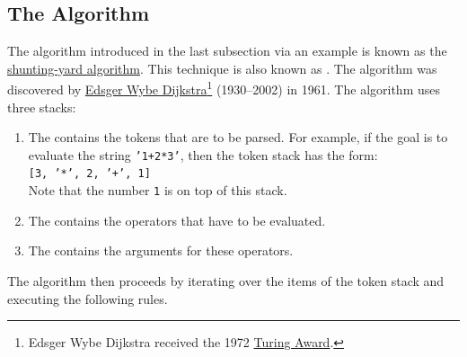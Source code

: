 \subsection{The Algorithm \label{algo-arith}}
The algorithm introduced in the last subsection via an example is known as the 
\href{http://en.wikipedia.org/wiki/Shunting-yard_algorithm}{shunting-yard algorithm}.  
This technique is also known as .
The algorithm was discovered by  \href{http://en.wikipedia.org/wiki/Edsger_Dijkstra}{Edsger Wybe Dijkstra}\footnote{
  Edsger Wybe Dijkstra received the 1972 \href{https://en.wikipedia.org/wiki/Turing_Award}{Turing Award}.
}
(1930--2002) in 1961.   The algorithm uses three stacks:
\begin{enumerate}
\item The  contains the tokens that are to be parsed.  For example,
      if the goal is to evaluate the string \texttt{'1+2*3'}, then the token stack has the form:
      \\[0.2cm]
      \hspace*{1.3cm}
      \texttt{[3, '*', 2, '+', 1]}
      \\[0.2cm]
      Note that the number \texttt{1} is on top of this stack.
\item The  contains the operators that have to be evaluated.
\item The  contains the arguments for these operators.
\end{enumerate}
The algorithm then proceeds by iterating over the items of the token stack and executing the following rules.
